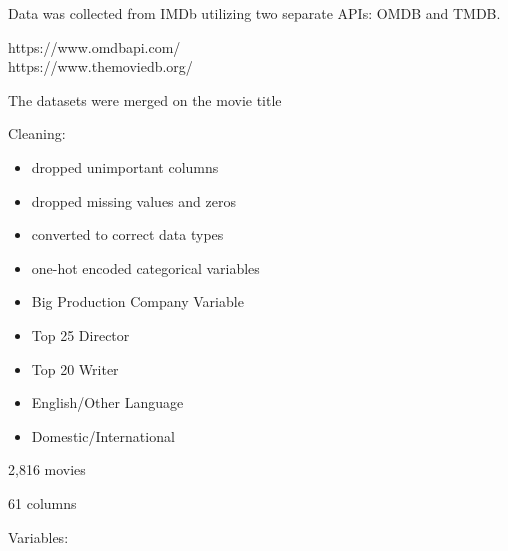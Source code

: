 \documentclass[
]{agujournal2019}
\providecommand{\tightlist}{%
  \setlength{\itemsep}{0pt}\setlength{\parskip}{0pt}}\usepackage{longtable,booktabs,array}
\begin{document}
Data was collected from IMDb utilizing two separate APIs: OMDB and TMDB.

https://www.omdbapi.com/\\
https://www.themoviedb.org/

The datasets were merged on the movie title

Cleaning:

\begin{itemize}
\tightlist
\item
  dropped unimportant columns\\
\item
  dropped missing values and zeros\\
\item
  converted to correct data types\\
\item
  one-hot encoded categorical variables\\
\item
  Big Production Company Variable\\
\item
  Top 25 Director\\
\item
  Top 20 Writer\\
\item
  English/Other Language\\
\item
  Domestic/International
\end{itemize}

2,816 movies

61 columns

Variables:
\end{document}

